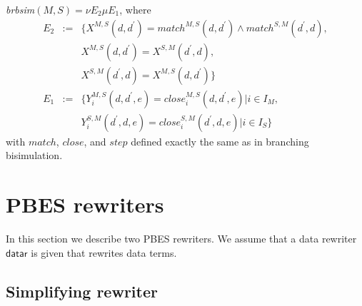 \documentclass{article}
\begin{document}
\emph{brbsim}$(M,S)=\nu E_{2}\mu E_{1}$, where%
\begin{equation*}
\begin{array}{ccl}
E_{2} & := & \{X^{M,S}(d,d^{\prime })=match^{M,S}(d,d^{\prime })\wedge
match^{S,M}(d^{\prime },d), \\ 
&  & X^{M,S}(d,d^{\prime })=X^{S,M}(d^{\prime },d), \\ 
&  & X^{S,M}(d^{\prime },d)=X^{M,S}(d,d^{\prime })\} \\ 
E_{1} & := & \{Y_{i}^{M,S}(d,d^{\prime },e)=close_{i}^{M,S}(d,d^{\prime
},e)|i\in I_{M}, \\ 
&  & Y_{i}^{S,M}(d^{\prime },d,e)=close_{i}^{S,M}(d^{\prime },d,e)|i\in
I_{S}\}%
\end{array}%
\end{equation*}%
with $match$, $close$, and $step$ defined exactly the same as in branching
bisimulation.\newpage

\section{PBES rewriters}

In this section we describe two PBES rewriters. We assume that a data
rewriter $\mathsf{datar}$ is given that rewrites data terms.

\subsection{Simplifying rewriter}
\end{document}
